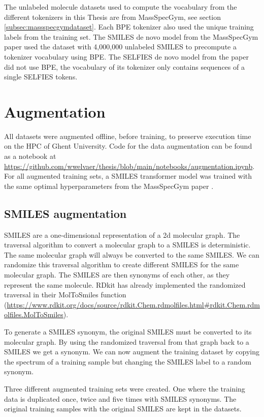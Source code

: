 The unlabeled molecule datasets used to compute the vocabulary from the different tokenizers in this Thesis are from MassSpecGym, see section \ref{subsec:massspecgymdataset}.
Each \ac{BPE} tokenizer also used the unique training labels from the training set.
The SMILES de novo model from the MassSpecGym paper \cite{bushuiev2024massspecgym} used the dataset with 4,000,000 unlabeled SMILES to precompute a tokenizer vocabulary using \ac{BPE}.
The SELFIES de novo model from the paper did not use \ac{BPE}, the vocabulary of its tokenizer only contains sequences of a single SELFIES tokens.

\section{Augmentation}
\label{sec:augmentation}

All datasets were augmented offline, before training, to preserve execution time on the \ac{HPC} of Ghent University.
Code for the data augmentation can be found as a notebook at \url{https://github.com/wwelvaer/thesis/blob/main/notebooks/augmentation.ipynb}.
For all augmented training sets, a SMILES transformer model was trained with the same optimal hyperparameters from the MassSpecGym paper \cite{bushuiev2024massspecgym}.

\subsection{SMILES augmentation}

SMILES are a one-dimensional representation of a 2d molecular graph.
The traversal algorithm to convert a molecular graph to a SMILES is deterministic.
The same molecular graph will always be converted to the same SMILES.
We can randomize this traversal algorithm to create different SMILES for the same molecular graph.
The SMILES are then synonyms of each other, as they represent the same molecule.
RDkit has already implemented the randomized traversal in their MolToSmiles function (\url{https://www.rdkit.org/docs/source/rdkit.Chem.rdmolfiles.html#rdkit.Chem.rdmolfiles.MolToSmiles}).

To generate a SMILES synonym, the original SMILES must be converted to its molecular graph. 
By using the randomized traversal from that graph back to a SMILES we get a synonym.
We can now augment the training dataset by copying the spectrum of a training sample but changing the SMILES label to a random synonym.

Three different augmented training sets were created. One where the training data is duplicated once, twice and five times with SMILES synonyms.
The original training samples with the original SMILES are kept in the datasets.

